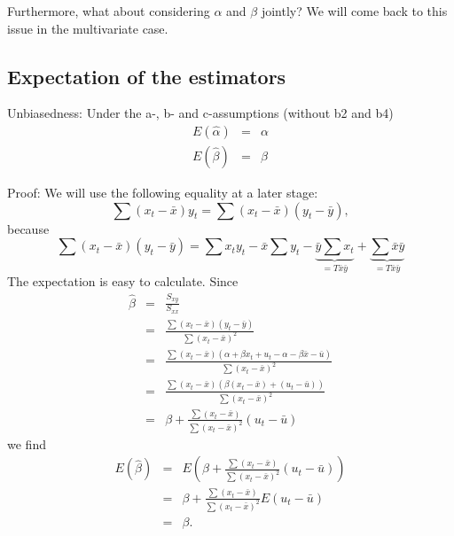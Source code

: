\documentclass{article}
\begin{document}
Furthermore, what about considering $\alpha$ and $\beta$ jointly? We will come back to this issue in the multivariate case.
\subsection*{Expectation of the estimators}

Unbiasedness: Under the a-, b- and c-assumptions (without b2 and b4)
\begin{eqnarray*}
E(\hat{\alpha}) &=&\alpha \\
E(\hat{\beta}) &=&\beta
\end{eqnarray*}

Proof: We will use the following equality at a later stage:
\[
\sum \left( x_{t}-\bar{x}\right) y_{t}=\sum \left( x_{t}-\bar{x}\right)
\left( y_{t}-\bar{y}\right) , 
\]%
because
\[
\sum \left( x_{t}-\bar{x}\right) \left( y_{t}-\bar{y}\right) =\sum
x_{t}y_{t}-\bar{x}\sum y_{t}-\underbrace{\bar{y}\sum x_{t}}_{=T\bar{x}\bar{y}%
}+\underbrace{\sum \bar{x}\bar{y}}_{=T\bar{x}\bar{y}} 
\]%
The expectation is easy to calculate. Since
\begin{eqnarray}
\hat{\beta} &=&\frac{S_{xy}}{S_{xx}}  \nonumber \\
&=&\frac{\sum \left( x_{t}-\bar{x}\right) \left( y_{t}-\bar{y}\right) }{\sum
\left( x_{t}-\bar{x}\right) ^{2}}  \nonumber \\
&=&\frac{\sum \left( x_{t}-\bar{x}\right) \left( \alpha +\beta
x_{t}+u_{t}-\alpha -\beta \bar{x}-\bar{u}\right) }{\sum \left( x_{t}-\bar{x}%
\right) ^{2}}  \nonumber \\
&=&\frac{\sum \left( x_{t}-\bar{x}\right) \left( \beta \left( x_{t}-\bar{x}%
\right) +\left( u_{t}-\bar{u}\right) \right) }{\sum \left( x_{t}-\bar{x}%
\right) ^{2}}  \nonumber \\
&=&\beta +\frac{\sum \left( x_{t}-\bar{x}\right) }{\sum \left( x_{t}-\bar{x}%
\right) ^{2}}\left( u_{t}-\bar{u}\right)  \label{betahat2}
\end{eqnarray}%
we find
\begin{eqnarray*}
E(\hat{\beta}) &=&E\left( \beta +\frac{\sum \left( x_{t}-\bar{x}%
\right) }{\sum \left( x_{t}-\bar{x}\right) ^{2}}\left( u_{t}-\bar{u}\right)
\right) \\
&=&\beta +\frac{\sum \left( x_{t}-\bar{x}\right) }{\sum \left( x_{t}-\bar{x}%
\right) ^{2}}E\left( u_{t}-\bar{u}\right) \\
&=&\beta .
\end{eqnarray*}
\end{document}
